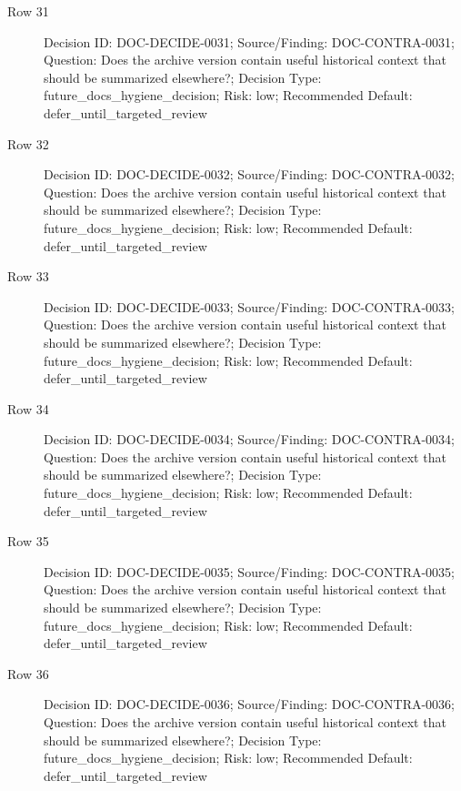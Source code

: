 \documentclass[10.5pt,a4paper,openany]{book}
\begin{document}
\begin{description}
\item[Row 31] Decision ID: DOC-\allowbreak{}DECIDE-\allowbreak{}0031; Source/\allowbreak{}Finding: DOC-\allowbreak{}CONTRA-\allowbreak{}0031; Question: Does the archive version contain useful historical context that should be summarized elsewhere?; Decision Type: future\_\allowbreak{}docs\_\allowbreak{}hygiene\_\allowbreak{}decision; Risk: low; Recommended Default: defer\_\allowbreak{}until\_\allowbreak{}targeted\_\allowbreak{}review
\item[Row 32] Decision ID: DOC-\allowbreak{}DECIDE-\allowbreak{}0032; Source/\allowbreak{}Finding: DOC-\allowbreak{}CONTRA-\allowbreak{}0032; Question: Does the archive version contain useful historical context that should be summarized elsewhere?; Decision Type: future\_\allowbreak{}docs\_\allowbreak{}hygiene\_\allowbreak{}decision; Risk: low; Recommended Default: defer\_\allowbreak{}until\_\allowbreak{}targeted\_\allowbreak{}review
\item[Row 33] Decision ID: DOC-\allowbreak{}DECIDE-\allowbreak{}0033; Source/\allowbreak{}Finding: DOC-\allowbreak{}CONTRA-\allowbreak{}0033; Question: Does the archive version contain useful historical context that should be summarized elsewhere?; Decision Type: future\_\allowbreak{}docs\_\allowbreak{}hygiene\_\allowbreak{}decision; Risk: low; Recommended Default: defer\_\allowbreak{}until\_\allowbreak{}targeted\_\allowbreak{}review
\item[Row 34] Decision ID: DOC-\allowbreak{}DECIDE-\allowbreak{}0034; Source/\allowbreak{}Finding: DOC-\allowbreak{}CONTRA-\allowbreak{}0034; Question: Does the archive version contain useful historical context that should be summarized elsewhere?; Decision Type: future\_\allowbreak{}docs\_\allowbreak{}hygiene\_\allowbreak{}decision; Risk: low; Recommended Default: defer\_\allowbreak{}until\_\allowbreak{}targeted\_\allowbreak{}review
\item[Row 35] Decision ID: DOC-\allowbreak{}DECIDE-\allowbreak{}0035; Source/\allowbreak{}Finding: DOC-\allowbreak{}CONTRA-\allowbreak{}0035; Question: Does the archive version contain useful historical context that should be summarized elsewhere?; Decision Type: future\_\allowbreak{}docs\_\allowbreak{}hygiene\_\allowbreak{}decision; Risk: low; Recommended Default: defer\_\allowbreak{}until\_\allowbreak{}targeted\_\allowbreak{}review
\item[Row 36] Decision ID: DOC-\allowbreak{}DECIDE-\allowbreak{}0036; Source/\allowbreak{}Finding: DOC-\allowbreak{}CONTRA-\allowbreak{}0036; Question: Does the archive version contain useful historical context that should be summarized elsewhere?; Decision Type: future\_\allowbreak{}docs\_\allowbreak{}hygiene\_\allowbreak{}decision; Risk: low; Recommended Default: defer\_\allowbreak{}until\_\allowbreak{}targeted\_\allowbreak{}review

\end{description}
\end{document}
